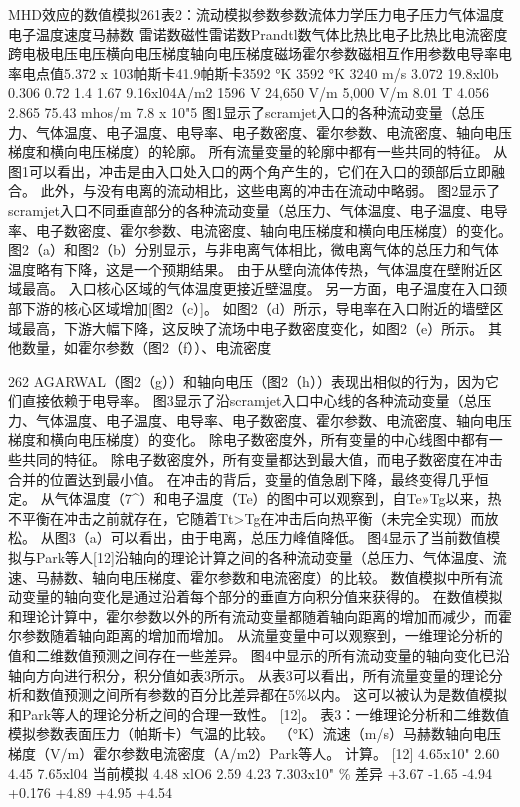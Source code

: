 \documentclass[UTF8,11pt,a4paper,openany,fontset=fandol]{ctexbook}
\begin{document}
MHD效应的数值模拟261表2：流动模拟参数参数流体力学压力电子压力气体温度电子温度速度马赫数 雷诺数磁性雷诺数Prandtl数气体比热比电子比热比电流密度跨电极电压电压横向电压梯度轴向电压梯度磁场霍尔参数磁相互作用参数电导率电率电点值5.372 x 103帕斯卡41.9帕斯卡3592 °K 3592 °K 3240 m/s 3.072 19.8xl0b 0.306 0.72 1.4 1.67 9.16xl04A/m2 1596 V 24,650 V/m 5,000 V/m 8.01 T 4.056 2.865 75.43 mhos/m 7.8 x 10"5 图1显示了scramjet入口的各种流动变量（总压力、气体温度、电子温度、电导率、电子数密度、霍尔参数、电流密度、轴向电压梯度和横向电压梯度）的轮廓。 所有流量变量的轮廓中都有一些共同的特征。 从图1可以看出，冲击是由入口处入口的两个角产生的，它们在入口的颈部后立即融合。 此外，与没有电离的流动相比，这些电离的冲击在流动中略弱。 图2显示了scramjet入口不同垂直部分的各种流动变量（总压力、气体温度、电子温度、电导率、电子数密度、霍尔参数、电流密度、轴向电压梯度和横向电压梯度）的变化。 图2（a）和图2（b）分别显示，与非电离气体相比，微电离气体的总压力和气体温度略有下降，这是一个预期结果。 由于从壁向流体传热，气体温度在壁附近区域最高。 入口核心区域的气体温度更接近壁温度。 另一方面，电子温度在入口颈部下游的核心区域增加[图2（c）]。 如图2（d）所示，导电率在入口附近的墙壁区域最高，下游大幅下降，这反映了流场中电子数密度变化，如图2（e）所示。 其他数量，如霍尔参数（图2（f））、电流密度

262 AGARWAL（图2（g））和轴向电压（图2（h））表现出相似的行为，因为它们直接依赖于电导率。 图3显示了沿scramjet入口中心线的各种流动变量（总压力、气体温度、电子温度、电导率、电子数密度、霍尔参数、电流密度、轴向电压梯度和横向电压梯度）的变化。 除电子数密度外，所有变量的中心线图中都有一些共同的特征。 除电子数密度外，所有变量都达到最大值，而电子数密度在冲击合并的位置达到最小值。 在冲击的背后，变量的值急剧下降，最终变得几乎恒定。 从气体温度（7\textasciicircum{}）和电子温度（Te）的图中可以观察到，自Te»Tg以来，热不平衡在冲击之前就存在，它随着Tt>Tg在冲击后向热平衡（未完全实现）而放松。 从图3（a）可以看出，由于电离，总压力峰值降低。 图4显示了当前数值模拟与Park等人[12]沿轴向的理论计算之间的各种流动变量（总压力、气体温度、流速、马赫数、轴向电压梯度、霍尔参数和电流密度）的比较。 数值模拟中所有流动变量的轴向变化是通过沿着每个部分的垂直方向积分值来获得的。 在数值模拟和理论计算中，霍尔参数以外的所有流动变量都随着轴向距离的增加而减少，而霍尔参数随着轴向距离的增加而增加。 从流量变量中可以观察到，一维理论分析的值和二维数值预测之间存在一些差异。 图4中显示的所有流动变量的轴向变化已沿轴向方向进行积分，积分值如表3所示。 从表3可以看出，所有流量变量的理论分析和数值预测之间所有参数的百分比差异都在5\%以内。 这可以被认为是数值模拟和Park等人的理论分析之间的合理一致性。 [12]。 表3：一维理论分析和二维数值模拟参数表面压力（帕斯卡）气温的比较。 （°K）流速（m/s）马赫数轴向电压梯度（V/m）霍尔参数电流密度（A/m2）Park等人。 计算。 [12] 4.65x10" 2.60 4.45 7.65xl04 当前模拟 4.48 xlO6 2.59 4.23 7.303x10" \% 差异 +3.67 -1.65 -4.94 +0.176 +4.89 +4.95 +4.54
\end{document}
